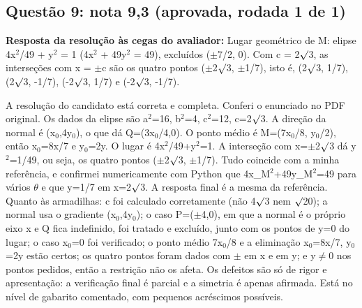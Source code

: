 \documentclass{article}%
\begin{document}
\subsection*{Questão 9: nota 9,3 (aprovada, rodada 1 de 1)}%
\textbf{Resposta da resolução às cegas do avaliador:} Lugar geométrico de M: elipse 4x$^2$/49 + y$^2$ = 1 (4x$^2$ + 49y$^2$ = 49), excluídos ($\pm$7/2, 0). Com c = 2$\surd$3, as interseções com x = $\pm$c são os quatro pontos ($\pm$2$\surd$3, $\pm$1/7), isto é, (2$\surd$3, 1/7), (2$\surd$3, -1/7), (-2$\surd$3, 1/7) e (-2$\surd$3, -1/7).\par %
A resolução do candidato está correta e completa. Conferi o enunciado no PDF original. Os dados da elipse são a$^2$=16, b$^2$=4, c$^2$=12, c=2$\surd$3. A direção da normal é (x$_{0}$,4y$_{0}$), o que dá Q=(3x$_{0}$/4,0). O ponto médio é M=(7x$_{0}$/8, y$_{0}$/2), então x$_{0}$=8x/7 e y$_{0}$=2y. O lugar é 4x$^2$/49+y$^2$=1. A interseção com x=$\pm$2$\surd$3 dá y$^2$=1/49, ou seja, os quatro pontos ($\pm$2$\surd$3, $\pm$1/7). Tudo coincide com a minha referência, e confirmei numericamente com Python que 4x\_M$^2$+49y\_M$^2$=49 para vários $\theta$ e que y=1/7 em x=2$\surd$3. A resposta final é a mesma da referência. Quanto às armadilhas: c foi calculado corretamente (não 4$\surd$3 nem $\surd$20); a normal usa o gradiente (x$_{0}$,4y$_{0}$); o caso P=($\pm$4,0), em que a normal é o próprio eixo x e Q fica indefinido, foi tratado e excluído, junto com os pontos de y=0 do lugar; o caso x$_{0}$=0 foi verificado; o ponto médio 7x$_{0}$/8 e a eliminação x$_{0}$=8x/7, y$_{0}$=2y estão certos; os quatro pontos foram dados com $\pm$ em x e em y; e y$\neq$0 nos pontos pedidos, então a restrição não os afeta. Os defeitos são só de rigor e apresentação: a verificação final é parcial e a simetria é apenas afirmada. Está no nível de gabarito comentado, com pequenos acréscimos possíveis.%
\end{document}

